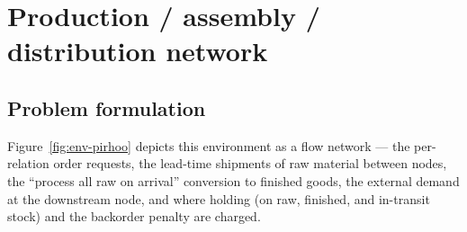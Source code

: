 \documentclass[11pt]{article}
\begin{document}
\section{Production / assembly / distribution network}
\label{sec:pirhoo}

\subsection{Problem formulation}
\label{sec:pirhoo-formulation}

Figure~\ref{fig:env-pirhoo} depicts this environment as a flow network --- the per-relation order
requests, the lead-time shipments of raw material between nodes, the ``process all raw on arrival''
conversion to finished goods, the external demand at the downstream node, and where holding (on raw,
finished, and in-transit stock) and the backorder penalty are charged.
\end{document}
